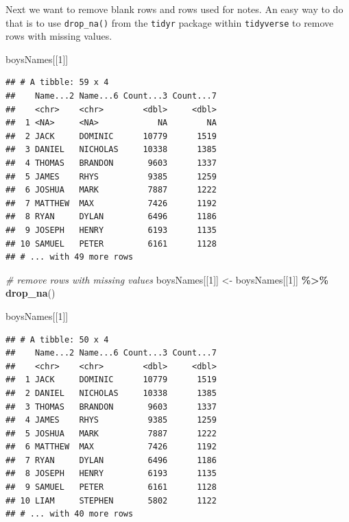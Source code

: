 \documentclass[
]{book}
\newenvironment{Shaded}{\begin{snugshade}}{\end{snugshade}}
\newcommand{\CommentTok}[1]{\textcolor[rgb]{0.56,0.35,0.01}{\textit{#1}}}
\newcommand{\DecValTok}[1]{\textcolor[rgb]{0.00,0.00,0.81}{#1}}
\newcommand{\KeywordTok}[1]{\textcolor[rgb]{0.13,0.29,0.53}{\textbf{#1}}}
\newcommand{\NormalTok}[1]{#1}
\newcommand{\OperatorTok}[1]{\textcolor[rgb]{0.81,0.36,0.00}{\textbf{#1}}}
\newcommand{\StringTok}[1]{\textcolor[rgb]{0.31,0.60,0.02}{#1}}
\begin{document}
Next we want to remove blank rows and rows used for notes. An easy way to do that is to use \texttt{drop\_na()} from the \texttt{tidyr} package within \texttt{tidyverse} to remove rows with missing values.

\begin{Shaded}
\begin{Highlighting}[]
\NormalTok{boysNames[[}\DecValTok{1}\NormalTok{]]}
\end{Highlighting}
\end{Shaded}

\begin{verbatim}
## # A tibble: 59 x 4
##    Name...2 Name...6 Count...3 Count...7
##    <chr>    <chr>        <dbl>     <dbl>
##  1 <NA>     <NA>            NA        NA
##  2 JACK     DOMINIC      10779      1519
##  3 DANIEL   NICHOLAS     10338      1385
##  4 THOMAS   BRANDON       9603      1337
##  5 JAMES    RHYS          9385      1259
##  6 JOSHUA   MARK          7887      1222
##  7 MATTHEW  MAX           7426      1192
##  8 RYAN     DYLAN         6496      1186
##  9 JOSEPH   HENRY         6193      1135
## 10 SAMUEL   PETER         6161      1128
## # ... with 49 more rows
\end{verbatim}

\begin{Shaded}
\begin{Highlighting}[]
\CommentTok{\# remove rows with missing values}
\NormalTok{boysNames[[}\DecValTok{1}\NormalTok{]] \textless{}{-}}\StringTok{ }\NormalTok{boysNames[[}\DecValTok{1}\NormalTok{]] }\OperatorTok{\%\textgreater{}\%}\StringTok{ }\KeywordTok{drop\_na}\NormalTok{()}

\NormalTok{boysNames[[}\DecValTok{1}\NormalTok{]]}
\end{Highlighting}
\end{Shaded}

\begin{verbatim}
## # A tibble: 50 x 4
##    Name...2 Name...6 Count...3 Count...7
##    <chr>    <chr>        <dbl>     <dbl>
##  1 JACK     DOMINIC      10779      1519
##  2 DANIEL   NICHOLAS     10338      1385
##  3 THOMAS   BRANDON       9603      1337
##  4 JAMES    RHYS          9385      1259
##  5 JOSHUA   MARK          7887      1222
##  6 MATTHEW  MAX           7426      1192
##  7 RYAN     DYLAN         6496      1186
##  8 JOSEPH   HENRY         6193      1135
##  9 SAMUEL   PETER         6161      1128
## 10 LIAM     STEPHEN       5802      1122
## # ... with 40 more rows
\end{verbatim}
\end{document}
